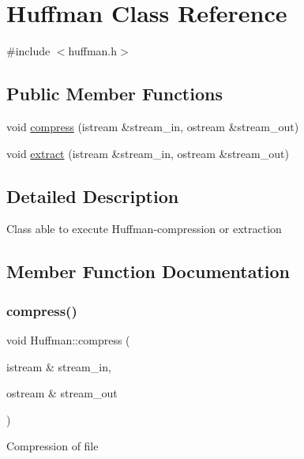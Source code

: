 \hypertarget{class_huffman}{}\section{Huffman Class Reference}
\label{class_huffman}


{\ttfamily \#include $<$huffman.\+h$>$}

\subsection*{Public Member Functions}
\begin{DoxyCompactItemize}
\item 
void \hyperlink{class_huffman_a692805d2f9f60f0a4663ec027b6f196d}{compress} (istream \&stream\+\_\+in, ostream \&stream\+\_\+out)
\item 
void \hyperlink{class_huffman_aca6b32706e62035b9dd6d7c9edba745e}{extract} (istream \&stream\+\_\+in, ostream \&stream\+\_\+out)
\end{DoxyCompactItemize}


\subsection{Detailed Description}
Class able to execute Huffman-\/compression or extraction 

\subsection{Member Function Documentation}
\mbox{\label{class_huffman_a692805d2f9f60f0a4663ec027b6f196d}} 
\subsubsection{\texorpdfstring{compress()}{compress()}}
{\footnotesize\ttfamily void Huffman\+::compress (\begin{DoxyParamCaption}\item[{istream \&}]{stream\+\_\+in,  }\item[{ostream \&}]{stream\+\_\+out }\end{DoxyParamCaption})}

Compression of file \mbox{\label{class_huffman_aca6b32706e62035b9dd6d7c9edba745e}} 
